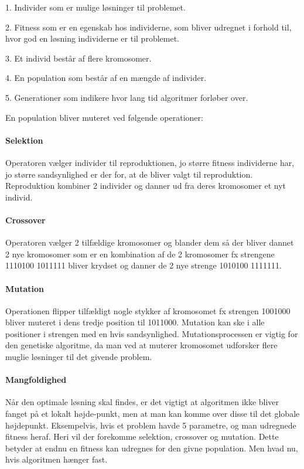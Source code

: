 1.	Individer som er mulige løsninger til problemet.

2.	Fitness som er en egenskab hos individerne, som bliver udregnet i forhold til, hvor god en løsning individerne er til problemet.

3.	Et individ består af flere kromosomer.

4.	En population som består af en mængde af individer.

5.	Generationer som indikere hvor lang tid algoritmer forløber over.

En population bliver muteret ved følgende operationer:

\paragraph{Selektion}

Operatoren vælger individer til reproduktionen, jo større fitness individerne har, jo større sandsynlighed er der for, at de bliver valgt til reproduktion. Reproduktion kombiner 2 individer og danner ud fra deres kromosomer et nyt individ.

\paragraph{Crossover}

Operatoren vælger 2 tilfældige kromosomer og blander dem så der bliver dannet 2 nye kromosomer som er en kombination af de 2 kromosomer fx strengene 1110100 1011111 bliver krydset og danner de 2 nye strenge 1010100 1111111.

\paragraph{Mutation}

Operationen flipper tilfældigt nogle stykker af kromosomet fx strengen 1001000 bliver muteret i dens tredje position til 1011000. Mutation kan ske i alle positioner i strengen med en hvis sandsynlighed. Mutationsprocessen er vigtig for den genetiske algoritme, da man ved at muterer kromosomet udforsker flere muglie løsninger til det givende problem.

\paragraph{Mangfoldighed}

Når den optimale løsning skal findes, er det vigtigt at algoritmen ikke bliver fanget på et lokalt højde-punkt, men at man kan komme over disse til det globale højdepunkt. Eksempelvis, hvis et problem havde 5 parametre, og man udregnede fitness heraf. Heri vil der forekomme selektion, crossover og mutation. Dette betyder at endnu en fitness kan udregnes for den givne population. Men hvad nu, hvis algoritmen hænger fast. 

